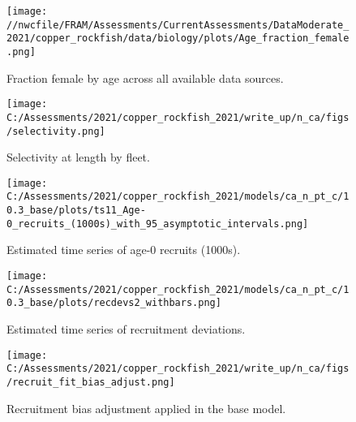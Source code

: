 \documentclass[11pt,
  english,
  a4paper,
]{article}
\begin{document}
\begin{figure}
\centering
\texttt{[image: //nwcfile/FRAM/Assessments/CurrentAssessments/DataModerate\_2021/copper\_rockfish/data/biology/plots/Age\_fraction\_female.png]}
\caption{Fraction female by age across all available data sources.\label{fig:age-sex-ratio}}
\end{figure}

\tagmcend\tagstructend


\begin{figure}
\centering
\texttt{[image: C:/Assessments/2021/copper\_rockfish\_2021/write\_up/n\_ca/figs/selectivity.png]}
\caption{Selectivity at length by fleet.\label{fig:selex}}
\end{figure}

\tagmcend\tagstructend


\begin{figure}
\centering
\texttt{[image: C:/Assessments/2021/copper\_rockfish\_2021/models/ca\_n\_pt\_c/10.3\_base/plots/ts11\_Age-0\_recruits\_(1000s)\_with\_95\_asymptotic\_intervals.png]}
\caption{Estimated time series of age-0 recruits (1000s).\label{fig:recruits}}
\end{figure}

\tagmcend\tagstructend


\begin{figure}
\centering
\texttt{[image: C:/Assessments/2021/copper\_rockfish\_2021/models/ca\_n\_pt\_c/10.3\_base/plots/recdevs2\_withbars.png]}
\caption{Estimated time series of recruitment deviations.\label{fig:rec-devs}}
\end{figure}

\tagmcend\tagstructend


\begin{figure}
\centering
\texttt{[image: C:/Assessments/2021/copper\_rockfish\_2021/write\_up/n\_ca/figs/recruit\_fit\_bias\_adjust.png]}
\caption{Recruitment bias adjustment applied in the base model.\label{fig:bias-adj}}
\end{figure}
\end{document}
